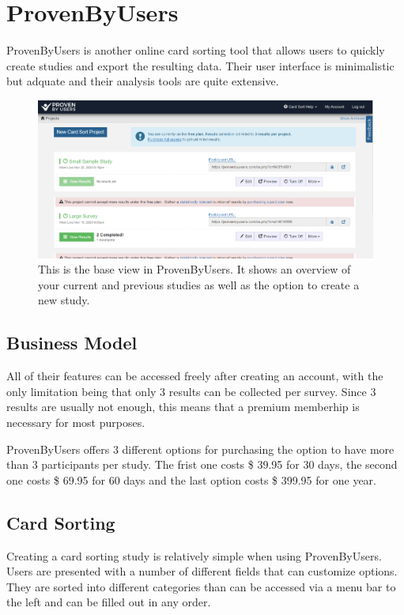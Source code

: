 \chapter{ProvenByUsers}

\label{chap:ProvenByUsers}


ProvenByUsers is another online card sorting tool that allows users to quickly 
create studies and export the resulting data. Their user interface is 
minimalistic but adquate and their analysis tools are quite extensive.

\begin{figure}[tp] 
\centering
\includegraphics[keepaspectratio,width=\linewidth,height=\halfh]{images/provenbyusers-dashboard.png}
\caption[ProvenByUsers Application] { This is the base view in ProvenByUsers.
It shows an overview of your current and previous studies as well as the option
to create a new study.
 }
\label{fig:ProvenByUsers1}
\end{figure}


\section{Business Model}
All of their features can be accessed freely after creating an account, with the
only limitation being that only 3 results can be collected per survey. Since 3 
results are usually not enough, this means that a premium memberhip is necessary
for most purposes.

ProvenByUsers offers 3 different options for purchasing the option to have 
more than 3 participants per study. The frist one costs \$ 39.95 for 30 days, 
the second one costs \$ 69.95 for 60 days and the last option costs \$ 399.95 
for one year.

\section{Card Sorting}
Creating a card sorting study is relatively simple when using ProvenByUsers.
 Users are presented with a number of different fields that can customize 
 options. They are sorted into different categories than can be accessed via a 
 menu bar to the left and can be filled out in any order. 

